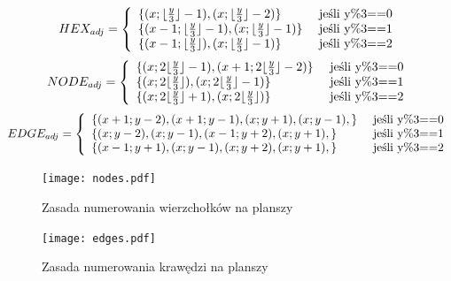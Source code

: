 \documentclass[a4paper,12pt]{article}
\begin{document}
\begin{equation}
  HEX_{adj}=
  \left\{
    \begin{array}{l l}
      \{
      (x; \lfloor\frac{y}{3}\rfloor-1),
      (x; \lfloor\frac{y}{3}\rfloor-2)
      \} & \mbox{ jeśli y\%3==0} \\
      \{
      (x-1; \lfloor\frac{y}{3}\rfloor-1),
      (x; \lfloor\frac{y}{3}\rfloor-1)
      \} & \mbox{ jeśli y\%3==1} \\
      \{
      (x-1; \lfloor\frac{y}{3}\rfloor),
      (x; \lfloor\frac{y}{3}\rfloor-1)
      \} & \mbox{ jeśli y\%3==2} \\
    \end{array} \right.
  \label{edgehexes}
\end{equation}
\begin{equation}
  NODE_{adj}=
  \left\{
    \begin{array}{l l}
      \{
      (x; 2\lfloor\frac{y}{3}\rfloor-1),
      (x+1; 2\lfloor\frac{y}{3}\rfloor-2)
      \} & \mbox{ jeśli y\%3==0} \\
      \{
      (x; 2\lfloor\frac{y}{3}\rfloor),
      (x; 2\lfloor\frac{y}{3}\rfloor-1)
      \} & \mbox{ jeśli y\%3==1} \\
      \{
      (x; 2\lfloor\frac{y}{3}\rfloor+1),
      (x; 2\lfloor\frac{y}{3}\rfloor)
      \} & \mbox{ jeśli y\%3==2} \\
    \end{array} \right.
  \label{edgenodes}
\end{equation}
\begin{equation}
  EDGE_{adj}=
  \left\{
    \begin{array}{l l}
      \{
      (x+1; y-2),
      (x+1; y-1),
      (x; y+1),
      (x; y-1),
      \} & \mbox{ jeśli y\%3==0} \\
      \{
      (x; y-2),
      (x; y-1),
      (x-1; y+2),
      (x; y+1),
      \} & \mbox{ jeśli y\%3==1} \\
      \{
      (x-1; y+1),
      (x; y-1),
      (x; y+2),
      (x; y+1),
      \} & \mbox{ jeśli y\%3==2} \\
    \end{array} \right.
  \label{edgenodes}
\end{equation}

\begin{figure}[ht]
  \begin{center}
    \texttt{[image: nodes.pdf]}
  \end{center}
  \caption{Zasada numerowania wierzchołków na planszy}
  \label{nodes}
\end{figure}

\begin{figure}[ht]
  \begin{center}
    \texttt{[image: edges.pdf]}
  \end{center}
  \caption{Zasada numerowania krawędzi na planszy}
  \label{edges}
\end{figure}

\clearpage



\end{document}
